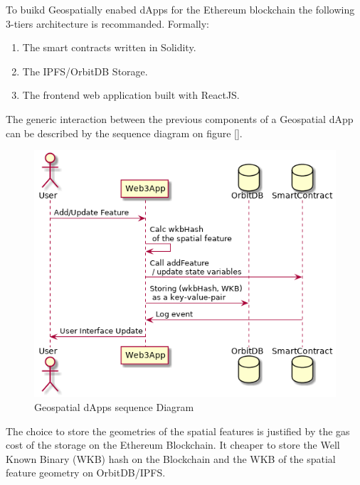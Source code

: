 \documentclass{isprs} %
\begin{document}
To buikd Geospatially enabed dApps for the Ethereum blockchain the following 3-tiers architecture is recommanded. Formally:

\begin{enumerate}
\setlength\itemsep{0em}\setlength\parskip{0em}\setlength\topsep{0em}\setlength\partopsep{0em}\setlength\parsep{0em} 
\item{The smart contracts written in Solidity.} 
\item{The IPFS/OrbitDB Storage.}
\item{The frontend web application built with ReactJS.}
\end{enumerate}

The generic interaction between the previous components of a Geospatial dApp can be described by the sequence diagram on figure [].

\begin{figure}[ht!]
\begin{center}
		\includegraphics[width=1.0\columnwidth]{figures/seq-geospatial-dapps.png}
	\caption{Geospatial dApps sequence Diagram}
\label{fig:figure_placement}
\end{center}
\end{figure}

The choice to store the geometries of the spatial features is justified by the gas cost of the storage on the Ethereum Blockchain. It cheaper to store the Well Known Binary (WKB) hash on the Blockchain and the WKB of the spatial feature geometry on OrbitDB/IPFS.
\end{document}
